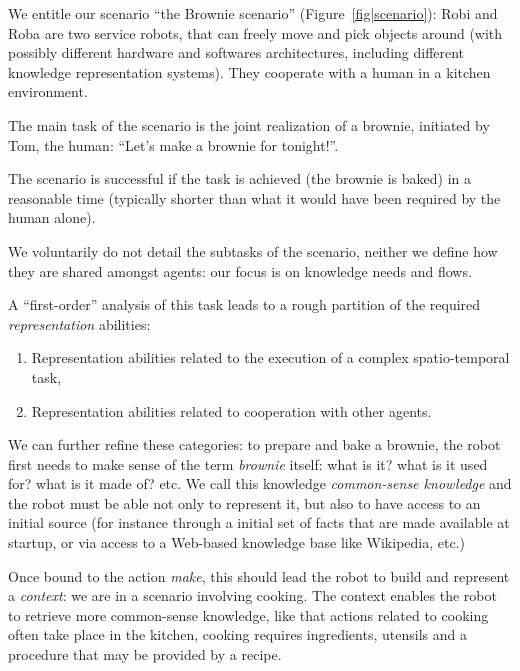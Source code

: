 We entitle our scenario ``the Brownie scenario'' (Figure~\ref{fig|scenario}):
Robi and Roba are two service robots, that can freely
move and pick objects around (with possibly different hardware and softwares
architectures, including different knowledge representation systems). They
cooperate with a human in a kitchen environment.

The main task of the scenario is the joint realization of a brownie, initiated
by Tom, the human: ``Let's make a brownie for tonight!''.

The scenario is successful if the task is achieved (the brownie is baked) in a
reasonable time (typically shorter than what it would have been required by the
human alone).

We voluntarily do not detail the subtasks of the scenario, neither we define
how they are shared amongst agents: our focus is on knowledge needs and flows.

A ``first-order'' analysis of this task leads to a rough partition of the
required \emph{representation} abilities:

\begin{enumerate}

	\item Representation abilities related to the execution of a complex
	spatio-temporal task,

	\item Representation abilities related to cooperation with other agents.

\end{enumerate}

We can further refine these categories: to prepare and bake a brownie, the
robot first needs to make sense of the term \emph{brownie} itself: what is it?
what is it used for? what is it made of? etc. We call this knowledge
\emph{common-sense knowledge} and the robot must be able not only to represent
it, but also to have access to an initial source (for instance through a
initial set of facts that are made available at startup, or via access to a
Web-based knowledge base like Wikipedia, etc.)

Once bound to the action \emph{make}, this should lead the robot to build and
represent a \emph{context}: we are in a scenario involving cooking. The context
enables the robot to retrieve more common-sense knowledge, like that actions
related to cooking often take place in the kitchen, cooking requires
ingredients, utensils and a procedure that may be provided by a recipe.


